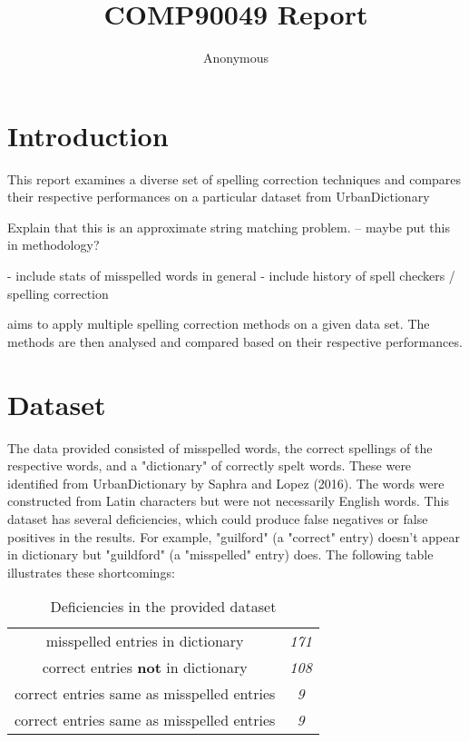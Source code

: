 \documentclass[11pt]{article}
\title{COMP90049 Report}
\author
{Anonymous}
\begin{document}
\maketitle



\section{Introduction}

This report examines a diverse set of spelling correction techniques and compares their respective performances on a particular dataset from UrbanDictionary %

Explain that this is an approximate string matching problem. -- maybe put this in methodology?

- include stats of misspelled words in general 
- include history of spell checkers / spelling correction 

aims to apply multiple spelling correction methods on a given data set. The methods are then analysed and compared based on their respective performances.

\section{Dataset}
The data provided consisted of misspelled words, the correct spellings of the respective words, and a "dictionary" of correctly spelt words. These were identified from UrbanDictionary by Saphra and Lopez (2016). The words were constructed from Latin characters but were not necessarily English words. This dataset has several deficiencies, which could produce false negatives or false positives in the results. For example, "guilford" (a "correct" entry) doesn't appear in dictionary but "guildford" (a "misspelled" entry) does. The following table illustrates these shortcomings:


\begin{table}[h]
\begin{center}
\begin{tabular}{|c|c|}

\hline
misspelled entries in dictionary & \textit{171}  \\ 
correct entries \textbf{not} in dictionary & \textit{108} \\ 
correct entries same as misspelled entries & \textit{9} \\
correct entries same as misspelled entries & \textit{9} \\
\hline

\end{tabular}
\caption{Deficiencies in the provided dataset}\label{table1}
 \end{center}
\end{table}
\end{document}
